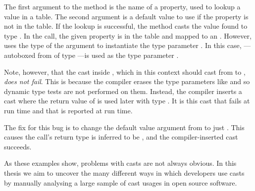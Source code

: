 The first argument to the method is the name of a property,
used to lookup a value in a table.
The second argument is a default value to use if the property is not in the table.
If the lookup is successful,
the method casts the value found to type .
In the call, the given property
 is in the table and mapped to an .
However, \java{} uses the type of the  argument 
to instantiate the type parameter .
In this case, ---autoboxed from  of type ---is used as the type parameter .

Note, however, that the cast inside , which in this context
should cast from  to , \emph{does not fail}.
This is because the \java{} compiler erases the type
parameters like  and so dynamic type tests are not performed on them.
Instead, the compiler inserts a cast where the return value
of  is used later with type .
It is this cast that fails at run time and that is reported at run time.

The fix for this bug is to change the default value argument from 
to just .
This causes the call's return type is inferred to be
, and the compiler-inserted cast succeeds.

As these examples show, problems with casts are not always obvious.
In this thesis we aim to uncover the many different ways in which developers use casts
by manually analysing a large sample of cast usages in open source software.